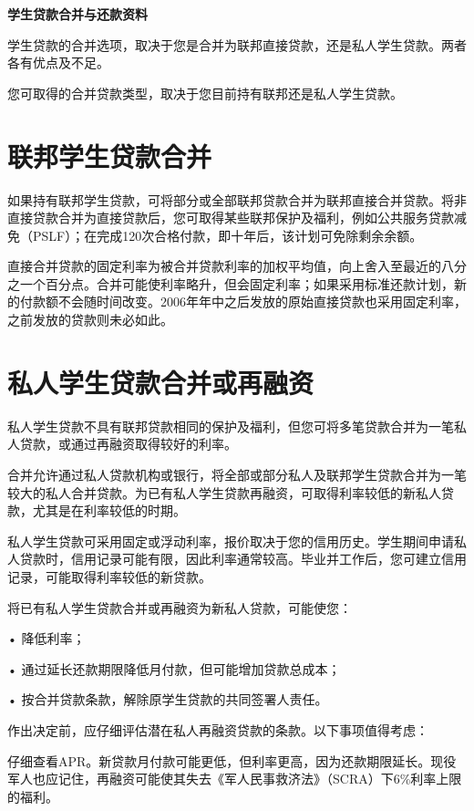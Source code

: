 \documentclass[UTF8,fontset=none,11pt,a4paper]{ctexart}
\begin{document}
{\noindent\fontsize{20}{25}\selectfont\bfseries 学生贷款合并与还款资料\par}
\vspace{10pt}
学生贷款的合并选项，取决于您是合并为联邦直接贷款，还是私人学生贷款。两者各有优点及不足。


您可取得的合并贷款类型，取决于您目前持有联邦还是私人学生贷款。


\section*{联邦学生贷款合并}
如果持有联邦学生贷款，可将部分或全部联邦贷款合并为联邦直接合并贷款。将非直接贷款合并为直接贷款后，您可取得某些联邦保护及福利，例如公共服务贷款减免（PSLF）；在完成120次合格付款，即十年后，该计划可免除剩余余额。


直接合并贷款的固定利率为被合并贷款利率的加权平均值，向上舍入至最近的八分之一个百分点。合并可能使利率略升，但会固定利率；如果采用标准还款计划，新的付款额不会随时间改变。2006年年中之后发放的原始直接贷款也采用固定利率，之前发放的贷款则未必如此。


\section*{私人学生贷款合并或再融资}
私人学生贷款不具有联邦贷款相同的保护及福利，但您可将多笔贷款合并为一笔私人贷款，或通过再融资取得较好的利率。


合并允许通过私人贷款机构或银行，将全部或部分私人及联邦学生贷款合并为一笔较大的私人合并贷款。为已有私人学生贷款再融资，可取得利率较低的新私人贷款，尤其是在利率较低的时期。


私人学生贷款可采用固定或浮动利率，报价取决于您的信用历史。学生期间申请私人贷款时，信用记录可能有限，因此利率通常较高。毕业并工作后，您可建立信用记录，可能取得利率较低的新贷款。


将已有私人学生贷款合并或再融资为新私人贷款，可能使您：


• 降低利率；


• 通过延长还款期限降低月付款，但可能增加贷款总成本；


• 按合并贷款条款，解除原学生贷款的共同签署人责任。


作出决定前，应仔细评估潜在私人再融资贷款的条款。以下事项值得考虑：


仔细查看APR。新贷款月付款可能更低，但利率更高，因为还款期限延长。现役军人也应记住，再融资可能使其失去《军人民事救济法》（SCRA）下6\%利率上限的福利。
\end{document}

